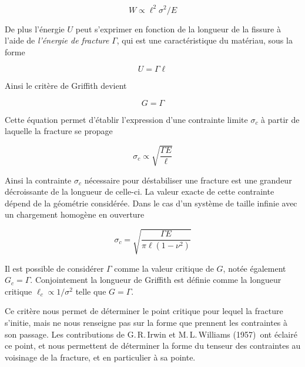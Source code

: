 \begin{equation}
W\propto \ell^2\sigma^2/E
\end{equation}

De plus l'énergie $U$ peut s'exprimer en fonction de la longueur de la fissure à l'aide de \textit{l'énergie de fracture} $\Gamma$, qui est une caractéristique du matériau, sous la forme

\begin{equation}
U = \Gamma \ell
\end{equation}

Ainsi le critère de Griffith devient

\begin{equation}
G=\Gamma
\end{equation}


Cette équation permet d'établir l'expression d'une contrainte limite $\sigma_c$ à partir de laquelle la fracture se propage\,\cite{griffith_phenomena_1921,freund_dynamic_1990}

\begin{equation}
\sigma_c\propto\sqrt{\frac{\Gamma E}{\ell}}
\end{equation}

Ainsi la contrainte $\sigma_c$ nécessaire pour déstabiliser une fracture est une grandeur décroissante de la longueur de celle-ci. La valeur exacte de cette contrainte dépend de la géométrie considérée. Dans le cas d'un système de taille infinie avec un chargement homogène en ouverture\,\cite{sun_fracture_2012}


\begin{equation}
\sigma_c=\sqrt{\frac{\Gamma E}{\pi\ell(1-\nu^2)}}
\end{equation}


Il est possible de considérer $\Gamma$ comme la valeur critique de $G$, notée également $G_c = \Gamma$. Conjointement la longueur de Griffith est définie comme la longueur critique $\ell_c\propto1/\sigma^{2}$ telle que $G=\Gamma$.


Ce critère nous permet de déterminer le point critique pour lequel la fracture s'initie, mais ne nous renseigne pas sur la forme que prennent les contraintes à son passage. Les contributions de G.\,R.\,Irwin et M.\,L.\,Williams (1957)\,\cite{irwin_analysis_1957,williams_stress_1957} ont éclairé ce point, et nous permettent de déterminer la forme du tenseur des contraintes au voisinage de la fracture, et en particulier à sa pointe.






